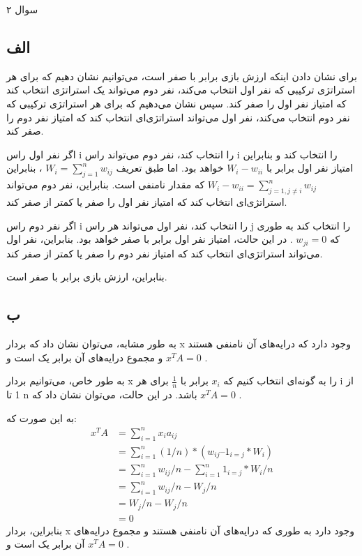 سوال ۲

\subsection*{الف}

برای نشان دادن اینکه ارزش بازی برابر با صفر است، می‌توانیم نشان دهیم که برای هر استراتژی ترکیبی که نفر اول انتخاب می‌کند، نفر دوم می‌تواند یک استراتژی انتخاب کند که امتیاز نفر اول را صفر کند. سپس نشان می‌دهیم که برای هر استراتژی ترکیبی که نفر دوم انتخاب می‌کند، نفر اول می‌تواند استراتژی‌ای انتخاب کند که امتیاز نفر دوم را صفر کند.

اگر نفر اول راس i را انتخاب کند، نفر دوم می‌تواند راس i را انتخاب کند و بنابراین امتیاز نفر اول برابر با
$W_{i} - w_{ii}$
خواهد بود. اما طبق تعریف
$W_i = \sum_{j=1} ^{n} w_{ij}$
، بنابراین
$W_{i} - w_{ii} = \sum_{j=1, j \neq i} ^{n} w_{ij}$
که مقدار نامنفی است. بنابراین، نفر دوم می‌تواند استراتژی‌ای انتخاب کند که امتیاز نفر اول را صفر یا کمتر از صفر کند.

اگر نفر دوم راس i را انتخاب کند، نفر اول می‌تواند هر راس j را انتخاب کند به طوری که
$w_{ji} = 0$
 . در این حالت، امتیاز نفر اول برابر با صفر خواهد بود. بنابراین، نفر اول می‌تواند استراتژی‌ای انتخاب کند که امتیاز نفر دوم را صفر یا کمتر از صفر کند.

بنابراین، ارزش بازی برابر با صفر است.

\subsection*{ب}

به طور مشابه، می‌توان نشان داد که بردار x وجود دارد که درایه‌های آن نامنفی هستند و مجموع درایه‌های آن برابر یک است و
$x^{T}A = 0$
.

به طور خاص، می‌توانیم بردار x را به گونه‌ای انتخاب کنیم که
$x_i$
برابر با
$\frac{1}{n}$
برای هر i از 1 تا n باشد. در این حالت، می‌توان نشان داد که
$x^{T}A = 0$
.

به این صورت که:
\begin{align*}
	x^{T}A &= \sum_{i=1}^{n} x_i a_{ij} \\
	&= \sum_{i=1}^{n} (1/n) * (w_{ij} – 1_{i = j} * W_{i}) \\
	&= \sum_{i=1}^{n} w_{ij}/n - \sum_{i=1}^{n} 1_{i = j} * W_{i}/n \\
	&= \sum_{i=1}^{n} w_{ij}/n - W_{j}/n \\
	&= W_{j}/n - W_{j}/n \\
	&= 0
\end{align*}
بنابراین، بردار x وجود دارد به طوری که درایه‌های آن نامنفی هستند و مجموع درایه‌های آن برابر یک است و
$x^{T}A = 0$
 .
 
 